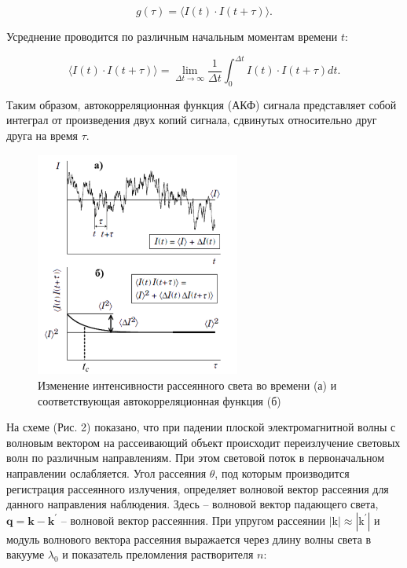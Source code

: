\documentclass[a4paper,12pt]{article} %
\begin{document}
\begin{equation}
g(\tau)=\langle I(t) \cdot I(t+\tau)\rangle.
\end{equation}

Усреднение проводится по различным начальным моментам времени $t$:

\begin{equation}
\langle I(t) \cdot I(t+\tau)\rangle=\lim _{\Delta t \rightarrow \infty} \frac{1}{\Delta t} \int_{0}^{\Delta t} I(t) \cdot I(t+\tau) d t.
\end{equation}

Таким образом, автокорреляционная функция (АКФ) сигнала представляет собой интеграл от произведения двух копий сигнала, сдвинутых относительно друг друга на время $τ$.

\begin{center}
\begin{figure}[h!]
\includegraphics[width=0.6\textwidth]{afk.png}
\caption{Изменение интенсивности рассеянного света во времени (а) и соответствующая автокорреляционная функция (б) }
\end{figure}
\end{center}

На схеме (Рис. 2) показано, что при падении плоской электромагнитной волны с волновым вектором  на рассеивающий объект происходит переизлучение световых волн по различным направлениям. При этом световой поток в первоначальном направлении ослабляется. Угол рассеяния $\theta$, под которым производится регистрация рассеянного излучения, определяет волновой вектор рассеяния для данного направления наблюдения. Здесь  – волновой вектор падающего света, $\boldsymbol{q}=\boldsymbol{k}-\boldsymbol{k}^{\prime}$ – волновой вектор рассеянния. При упругом рассеянии $|\mathrm{k}| \approx\left|\mathrm{k}^{\prime}\right|$ и модуль волнового вектора рассеяния  выражается через длину волны света в вакууме $\lambda_0$ и показатель преломления растворителя $n$:
\end{document}
